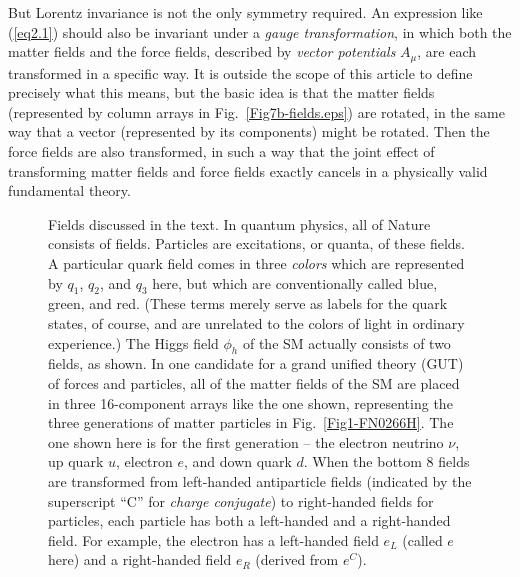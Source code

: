 \documentclass[12pt]{iopart}
\begin{document}
But Lorentz invariance is not the only symmetry required. An expression like (\ref{eq2.1}) should also be invariant under a \textit{gauge transformation}, in which both the matter fields and the force fields, described by \textit{vector potentials} $A_{\mu}$, are each transformed in a specific way. It is outside the scope of this article to define precisely what this means, but the basic idea is that the matter fields (represented by column arrays in Fig.~\ref{Fig7b-fields.eps}) are rotated, in the same way that a vector (represented by its components) might be rotated. Then the force fields are also transformed, in such a way that the joint effect of transforming matter fields and force fields exactly cancels in a physically valid fundamental theory.
\begin{figure}[htbp]
\centering
{}
 \caption{Fields discussed in the text. In quantum physics, all of Nature consists of fields. Particles are excitations, or quanta, of these fields. A particular quark field comes in three \textit{colors} which are represented by $q_1$, $q_2$, and $q_3$ here, but which are conventionally called blue, green, and red. (These terms merely serve as labels for the quark states, of course, and are unrelated to the colors of light in ordinary experience.) The Higgs field $\phi_h$ of the SM actually consists of two fields, as shown. 
\newline \indent
In one candidate for a grand unified theory (GUT) of forces and particles, all of the matter fields of the SM are placed in three 16-component arrays like the one shown, representing the three generations of matter particles in Fig.~\ref{Fig1-FN0266H}. The one shown here is for the first generation -- the electron neutrino $\nu$, up quark $u$, electron $e$, and down quark $d$. When the bottom 8 fields are transformed from left-handed antiparticle fields (indicated by the superscript ``C'' for \textit{charge conjugate}) to right-handed fields for particles, each particle has both a left-handed and a right-handed field. For example, the electron has a left-handed field $e_L$ (called $e$ here) and a right-handed field $e_R$ (derived from $e^C$). 
}
\end{figure}
\end{document}
